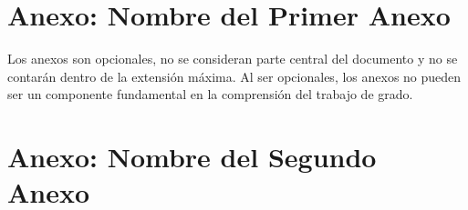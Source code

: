 \begin{appendix}
\chapter{Anexo: Nombre del Primer Anexo}\label{AnexoA}

\begin{tcolorbox}[width=\textwidth,colback={white},title={\textbf{Lineamientos del Capítulo Anexos}},colbacktitle=black,coltitle=white]    
Los anexos son opcionales, no se consideran parte central del documento y no se contarán dentro de la extensión máxima. Al ser opcionales, los anexos no pueden ser un componente fundamental en la comprensión del trabajo de grado.

\end{tcolorbox}   



\lipsum[9-10]

\chapter{Anexo: Nombre del Segundo Anexo}\label{AnexoB}

\lipsum[6-7]


\end{appendix}